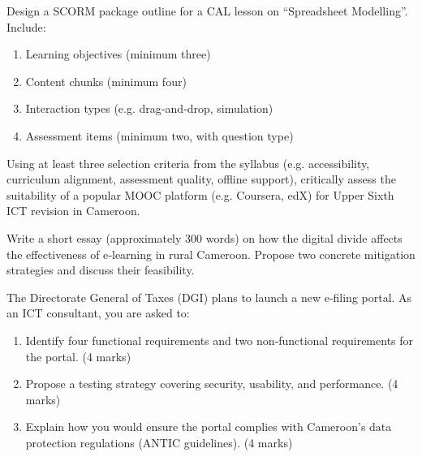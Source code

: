 \documentclass[11pt]{article}
\newcounter{popsec}
\newcounter{popsub}
\newcommand{\courssub}[1]{%
  \stepcounter{popsub}%
  \par\vspace{9pt}\noindent{\popxbold\fontsize{11.5}{13}\selectfont\color{popink}{\color{poporange}\thepopsec.\thepopsub}\hspace{6pt}#1}\par\nopagebreak\vspace{4pt}
}
\begin{document}
\begin{exercice}
Design a SCORM package outline for a CAL lesson on “Spreadsheet Modelling”. Include:
\begin{enumerate}
\item Learning objectives (minimum three)
\item Content chunks (minimum four)
\item Interaction types (e.g. drag‑and‑drop, simulation)
\item Assessment items (minimum two, with question type)
\end{enumerate}
\end{exercice}

\begin{exercice}
Using at least three selection criteria from the syllabus (e.g. accessibility, curriculum alignment, assessment quality, offline support), critically assess the suitability of a popular MOOC platform (e.g. Coursera, edX) for Upper Sixth ICT revision in Cameroon.
\end{exercice}

\courssub{I prepare for the GCE}

\begin{exercice}
Write a short essay (approximately 300 words) on how the digital divide affects the effectiveness of e‑learning in rural Cameroon. Propose two concrete mitigation strategies and discuss their feasibility.
\end{exercice}

\begin{exercice}
The Directorate General of Taxes (DGI) plans to launch a new e‑filing portal. As an ICT consultant, you are asked to:
\begin{enumerate}
\item Identify four functional requirements and two non‑functional requirements for the portal. (4 marks)
\item Propose a testing strategy covering security, usability, and performance. (4 marks)
\item Explain how you would ensure the portal complies with Cameroon’s data protection regulations (ANTIC guidelines). (4 marks)
\end{enumerate}
\end{exercice}
\end{document}
